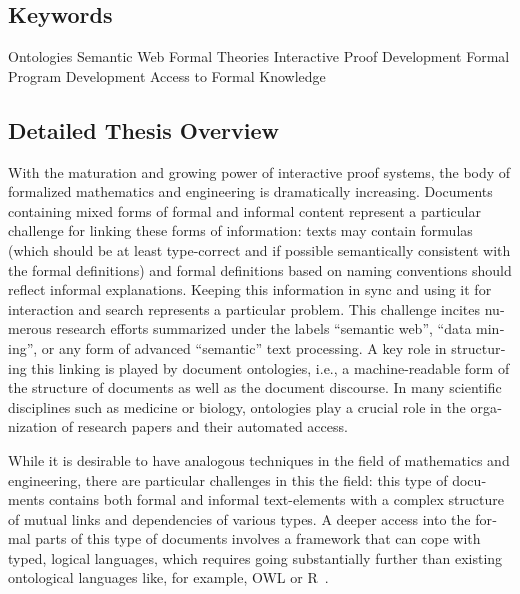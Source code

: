 \documentclass[a4paper,10pt]{article}
\begin{document}
\begin{english}

\subsection*{Keywords}

Ontologies \textemdash{}
Semantic Web \textemdash{}
Formal Theories \textemdash{}
Interactive Proof Development \textemdash{}
Formal Program Development \textemdash{}
Access to Formal Knowledge

\subsection*{Detailed Thesis Overview}

With the maturation and growing power of interactive proof systems,
the body of formalized mathematics and engineering is dramatically increasing.
Documents containing mixed forms of formal and informal content 
represent a particular challenge for linking these forms of information:
texts may contain formulas (which should be at least type-correct and 
if possible semantically consistent with the formal definitions) 
and formal definitions based on naming conventions should reflect
informal explanations. Keeping this information in sync and
using it for interaction and search represents a particular problem.
This challenge incites numerous research efforts
summarized under the labels \enquote{semantic web}, \enquote{data mining},
or any form of advanced \enquote{semantic} text processing.
A key role in structuring this linking is played by document ontologies,
i.e., a machine-readable form of the structure of documents
as well as the document discourse.
In many scientific disciplines such as medicine or biology,
ontologies play a crucial role in the organization of research papers
and their automated access.

While it is desirable to have analogous techniques
in the field of mathematics and engineering,
there are particular challenges in this the field:
this type of documents contains both formal and informal text-elements
with a complex structure of mutual links and dependencies of various types.
A deeper access into the formal parts of this type of documents involves
a framework that can cope with typed, logical languages,
which requires going substantially further
than existing ontological languages
like, for example, OWL or R~\cite{owl2012,protege,owlgred,rontorium}.


\end{english}
\end{document}
